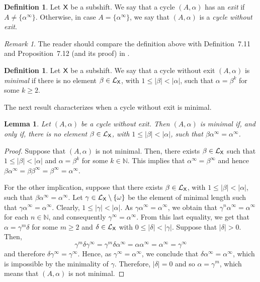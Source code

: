 \documentclass[a4paper,12pt]{amsart}
\newtheorem{lemma}[equation]{Lemma}
\theoremstyle{definition}
\newtheorem{definition}[equation]{Definition}
\theoremstyle{remark}
\newtheorem{remark}[equation]{Remark}
\numberwithin{equation}{section}
\newcommand{\osf}{{\normalfont \textsf{X}}}
\newcommand{\lang}{\CL_{\osf}}
\newcommand{\N}{\mathbb{N}}
\newcommand{\CL}{\mathcal{L}}
\begin{document}
\begin{definition}\label{cyclexit}
Let $\osf$ be a subshift. We say that a cycle $(A,\alpha)$ has an \emph{exit} if $A\neq \{\alpha^\infty\}$. Otherwise, in case $A=\{\alpha^\infty\}$, we say that $(A,\alpha)$ is a \emph{cycle without exit}.
\end{definition}

\begin{remark}
   The reader should compare the definition above with Definition~7.11 and Proposition~7.12 (and its proof) in  \cite{GillesDanie}.
\end{remark}

\begin{definition}\label{mini}
Let $\osf$ be a subshift. We say that a cycle without exit $(A,\alpha)$ is \emph{minimal} if there is no element $\beta\in \lang$, with $1\leq |\beta|<|\alpha|$, such that $\alpha=\beta^k$ for some $k\geq 2$.
\end{definition}

The next result characterizes when a cycle without exit is minimal.

\begin{lemma}\label{minimalversion01} Let $(A,\alpha)$ be a cycle without exit. Then $(A,\alpha)$ is minimal if, and only if, there is no element $
\beta \in \lang$, with $1\leq |\beta|<|\alpha|$, such that $\beta \alpha^\infty=\alpha^\infty$.
\end{lemma}

\begin{proof} Suppose that $(A,\alpha)$ is not minimal. Then, there exists $\beta\in \lang$ such that $1\leq |\beta|<|\alpha|$ and $\alpha=\beta^k$ for some $k\in \N$. This implies that $\alpha^\infty=\beta^\infty$ and hence $\beta \alpha^\infty=\beta \beta^\infty=\beta^\infty=\alpha^\infty$.

For the other implication, suppose that there exists $\beta\in \lang$, with $1\leq |\beta|<|\alpha|$, such that $\beta \alpha^\infty=\alpha^\infty$.  Let $\gamma \in \lang \setminus\{\omega\}$ be the element of minimal length such that $\gamma\alpha^\infty=\alpha^\infty$. Clearly, $1\leq |\gamma|<|\alpha|$. As $\gamma\alpha^\infty=\alpha^\infty$, we obtain that $\gamma^n \alpha^\infty=\alpha^\infty$ for each $n\in \N$, and consequently ${\gamma}^\infty=\alpha^\infty$. From this last equality, we get that $\alpha={\gamma}^m\delta$ for some $m\geq 2$ and $\delta\in \lang$ with $0\leq |\delta|<|\gamma|$. Suppose that $|\delta|>0$. Then, 
$${\gamma}^m\delta {\gamma}^\infty={\gamma}^m\delta \alpha^\infty=\alpha\alpha^\infty=\alpha^\infty={\gamma}^\infty$$ and therefore $\delta{\gamma}^\infty={\gamma}^\infty$. Hence, as ${\gamma}^\infty=\alpha^\infty$,  we conclude that $\delta\alpha^\infty=\alpha^\infty$, which is impossible by the minimality of $\gamma$. Therefore, $|\delta|=0$ and so $\alpha={\gamma}^m$, which means that $(A,\alpha)$ is not minimal.  
\end{proof}
\end{document}
